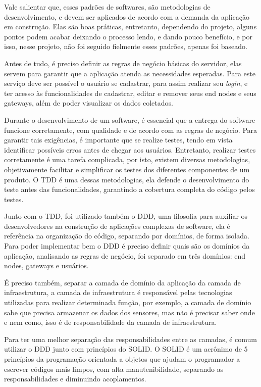 Vale salientar que, esses padrões de softwares, são metodologias de desenvolvimento, e devem ser aplicados de acordo com a demanda da aplicação em construção. Elas são boas práticas, entretanto, dependendo do projeto, alguns pontos podem acabar deixando o processo lendo, e dando pouco benefício, e por isso, nesse projeto, não foi seguido fielmente esses padrões, apenas foi baseado.

Antes de tudo, é preciso definir as regras de negócio básicas do servidor, elas servem para garantir que a aplicação atenda as necessidades esperadas. Para este serviço deve ser possível o usuário se cadastrar, para assim realizar seu \textit{login}, e ter acesso às funcionalidades de cadastrar, editar e remover seus end nodes e seus gateways, além de poder visualizar os dados coletados.

Durante o desenvolvimento de um software, é essencial que a entrega do software funcione corretamente, com qualidade e de acordo com as regras de negócio. Para garantir tais exigências, é importante que se realize testes, tendo em vista identificar possíveis erros antes de chegar aos usuários. Entretanto, realizar testes corretamente é uma tarefa complicada, por isto, existem diversas metodologias, objetivamente facilitar e simplificar os testes dos diferentes componentes de um produto. O TDD é uma dessas metodologias, ela defende o desenvolvimento do teste antes das funcionalidades, garantindo a cobertura completa do código pelos testes.

Junto com o TDD, foi utilizado também o DDD, uma filosofia para auxiliar os desenvolvedores na construção de aplicações complexas de software, ela é referência na organização do código, separando por domínios, de forma isolada. Para poder implementar bem o DDD é preciso definir quais são os domínios da aplicação, analisando as regras de negócio, foi separado em três domínios: end nodes, gateways e usuários.

É preciso também, separar a camada de domínio da aplicação da camada de infraestrutura, a camada de infraestrutura é responsável pelas tecnologias utilizadas para realizar determinada função, por exemplo, a camada de domínio sabe que precisa armazenar os dados dos sensores, mas não é precisar saber onde e nem como, isso é de responsabilidade da camada de infraestrutura.

Para ter uma melhor separação das responsabilidades entre as camadas, é comum utilizar o DDD junto com princípios do SOLID. O SOLID é um acrônimo de 5 princípios da programação orientada a objetos que ajudam o programador a escrever códigos mais limpos, com alta manutenibilidade, separando as responsabilidades e diminuindo acoplamentos.

